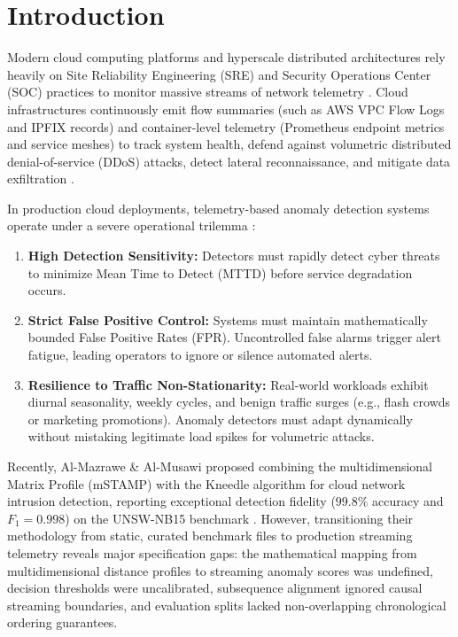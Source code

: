 \documentclass[10pt,twocolumn]{article}
\begin{document}
\section{Introduction}
Modern cloud computing platforms and hyperscale distributed architectures rely heavily on Site Reliability Engineering (SRE) and Security Operations Center (SOC) practices to monitor massive streams of network telemetry \cite{landauer2020deep}. Cloud infrastructures continuously emit flow summaries (such as AWS VPC Flow Logs and IPFIX records) and container-level telemetry (Prometheus endpoint metrics and service meshes) to track system health, defend against volumetric distributed denial-of-service (DDoS) attacks, detect lateral reconnaissance, and mitigate data exfiltration \cite{sharafaldin2018toward}.

In production cloud deployments, telemetry-based anomaly detection systems operate under a severe operational trilemma \cite{sommer2010outside}:
\begin{enumerate}
    \item \textbf{High Detection Sensitivity:} Detectors must rapidly detect cyber threats to minimize Mean Time to Detect (MTTD) before service degradation occurs.
    \item \textbf{Strict False Positive Control:} Systems must maintain mathematically bounded False Positive Rates (FPR). Uncontrolled false alarms trigger alert fatigue, leading operators to ignore or silence automated alerts.
    \item \textbf{Resilience to Traffic Non-Stationarity:} Real-world workloads exhibit diurnal seasonality, weekly cycles, and benign traffic surges (e.g., flash crowds or marketing promotions). Anomaly detectors must adapt dynamically without mistaking legitimate load spikes for volumetric attacks.
\end{enumerate}

Recently, Al-Mazrawe \& Al-Musawi \cite{almazrawe2025enhancing} proposed combining the multidimensional Matrix Profile (mSTAMP) with the Kneedle algorithm for cloud network intrusion detection, reporting exceptional detection fidelity ($99.8\%$ accuracy and $F_1 = 0.998$) on the UNSW-NB15 benchmark \cite{moustafa2015unsw}. However, transitioning their methodology from static, curated benchmark files to production streaming telemetry reveals major specification gaps: the mathematical mapping from multidimensional distance profiles to streaming anomaly scores was undefined, decision thresholds were uncalibrated, subsequence alignment ignored causal streaming boundaries, and evaluation splits lacked non-overlapping chronological ordering guarantees.
\end{document}

